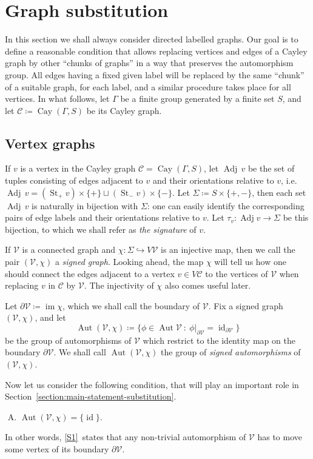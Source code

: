 \documentclass[10pt,a4paper]{amsart}
\newcommand{\ie}{i.e.\ }
\theoremstyle{definition}
\newcommand{\cC}{\mathcal{C}}
\newcommand{\cV}{\mathcal{V}}
\DeclareMathOperator{\St}{St}
\DeclareMathOperator{\Cay}{Cay}
\DeclareMathOperator{\aut}{Aut}
\DeclareMathOperator{\im}{im}
\DeclareMathOperator{\adj}{Adj}
\DeclareMathOperator{\id}{id}
\begin{document}
\section{Graph substitution}\label{graph-substitution}
In this section we shall always consider directed labelled graphs. Our goal is to define a reasonable condition that allows replacing vertices and edges of a Cayley graph by other ``chunks of graphs'' in a way that preserves the automorphism group. All edges having a fixed given label will be replaced by the same ``chunk'' of a suitable graph, for each label, and a similar procedure takes place for all vertices. In what follows, let $\Gamma$ be a finite group generated by a finite set $S$, and let $\cC \coloneqq \Cay(\Gamma, S)$ be its Cayley graph.

\subsection{Vertex graphs}\label{vertex-graphs-substitution}

If $v$ is a vertex in the Cayley graph $\cC = \Cay(\Gamma, S)$, let $\adj\, v$ be the set of tuples consisting of edges adjacent to $v$ and their orientations relative to $v$, \ie $\adj\, v = (\St_+ v){\times}\{+\} {\sqcup} (\St_- v){\times}\{-\}$. Let ${\Sigma}\coloneqq S{\times}\{+,-\}$, then each set $\adj\, v$ is naturally in bijection with ${\Sigma}$: one can easily identify the corresponding pairs of edge labels and their orientations relative to $v$. Let ${\tau}_v: \adj v \to {\Sigma}$ be this bijection, to which we shall refer as \emph{the signature} of $v$.

If $\cV$ is a connected graph and ${\chi}:{\Sigma}{\hookrightarrow}V\cV$ is an injective map, then we call the pair $(\cV,{\chi})$ a \emph{signed graph}. Looking ahead, the map ${\chi}$ will tell us how one should connect the edges adjacent to a vertex $v \in V\cC$ to the vertices of $\cV$ when replacing $v$ in $\cC$ by $\cV$. The injectivity of ${\chi}$ also comes useful later.
 
Let ${\partial}\cV\coloneqq \im {\chi}$, which we shall call the boundary of $\cV$. Fix a signed graph $(\cV, \chi)$, and let
\[
\aut(\cV,{\chi}) \coloneqq \{{\phi} \in \aut \cV\ :\ {\phi}|_{{\partial}\cV} = \id _{{\partial}\cV}\}
\]
be the group of automorphisms of $\cV$ which restrict to the identity map on the boundary ${\partial}\cV$. We shall call $\aut(\cV, {\chi})$ the group of \emph{signed automorphisms} of $(\cV, {\chi})$.
 
Now let us consider the following condition, that will play an important role in Section~\ref{section:main-statement-substitution}. 
\begin{enumerate}[S.\arabic*] %
\item \label{S1}
$\aut (\cV, {\chi}) = \{\id \}$. 
\end{enumerate}
In other words, \ref{S1}~states that any non-trivial automorphism of $\cV$ has to move some vertex of its boundary ${\partial}\cV$.
\end{document}
